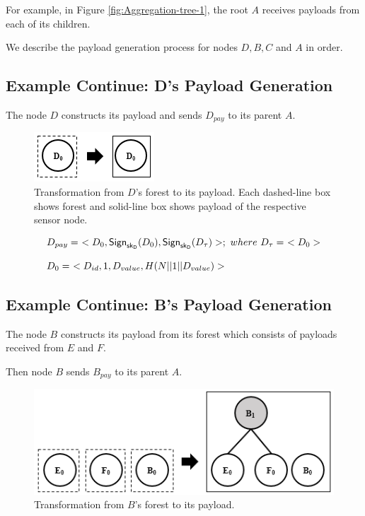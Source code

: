 \documentclass[%
  slidesonly,%
  semlayer%
  ]{seminar}                                  %
\newcommand{\sk}{\sf{sk}}
\begin{document}
\begin{slide}
      For example, in Figure \ref{fig:Aggregation-tree-1}, the root $A$ receives payloads from each of its children.
        
      We describe the payload generation process for nodes $D,B,C$ and $A$ in order.
      \vfill
      \clearpage

    \subsection*{Example Continue: D's Payload Generation}
      The node $D$ constructs its payload and sends $D_{pay}$ to its parent $A$.
      
      \begin{figure}[h!]
        \centering
        \includegraphics[scale = 0.5]{images/d-forest-payload.png}
        \caption{Transformation from $D$'s forest to its payload.
            Each dashed-line box shows forest and solid-line box shows payload of the respective sensor node.}
        \label{fig:d-forest-payload}
      \end{figure}
      \begin{equation*}
        \begin{array}{l}
          D_{pay} =\ <D_{0}, \textsf{Sign}_{\sk_{D}}(D_{0}), \textsf{Sign}_{\sk_{D}}(D_{\tau})>;\ where\ D_{\tau} =\ <D_{0}>\\
          \\
          D_{0} =\ <D_{id},1,D_{value},H(N||1||D_{value})>
        \end{array}
      \end{equation*}

      \vfill
      \clearpage

    \subsection*{Example Continue: B's Payload Generation}  
      The node $B$ constructs its payload from its forest which consists of payloads received from $E$ and $F$.

      Then node $B$ sends $B_{pay}$ to its parent $A$.
      \begin{figure}[h!]
        \centering
        \includegraphics[scale = 0.5]{images/b-forest-payload.png}
        \caption{Transformation from $B$'s forest to its payload.}
        \label{fig:b-forest-payload}
      \end{figure}
      

\end{slide}
\end{document}

